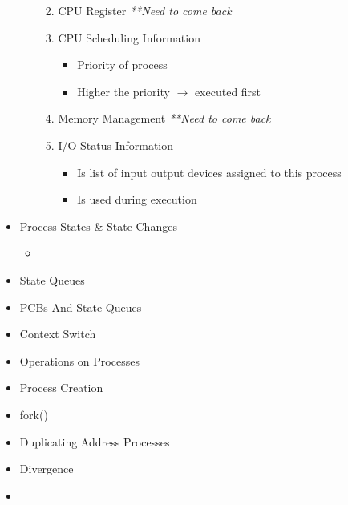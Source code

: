 \documentclass[12pt]{article}
\begin{document}
\begin{itemize}
\begin{itemize}
\begin{enumerate}
\begin{itemize}
            \end{itemize}
            \item CPU Register \textit{**Need to come back}
            \item CPU Scheduling Information
            \begin{itemize}
                \item Priority of process
                \item Higher the priority $\to$ executed first
            \end{itemize}
            \item Memory Management \textit{**Need to come back}
            \item I/O Status Information
            \begin{itemize}
                \item Is list of input output devices assigned to this process
                \item Is used during execution
            \end{itemize}
        \end{enumerate}
    \end{itemize}

    \item Process States \& State Changes
    \begin{itemize}
        \item
    \end{itemize}
    \item State Queues
    \item PCBs And State Queues
    \item Context Switch
    \item Operations on Processes
    \item Process Creation
    \item fork()
    \item Duplicating Address Processes
    \item Divergence
    \item
\end{itemize}
\end{document}
